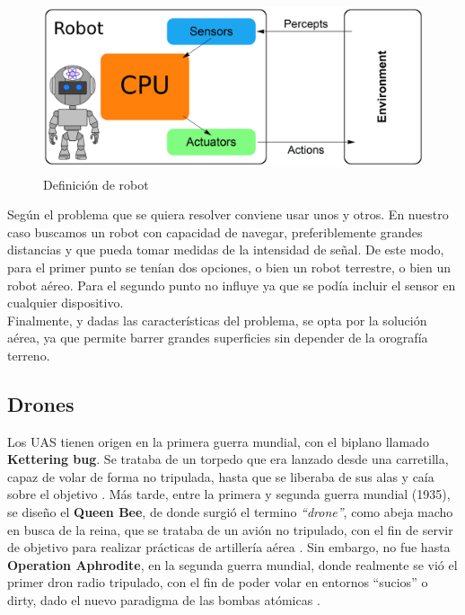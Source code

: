 \begin{figure} [H]
	\begin{center}
	\includegraphics[height=5cm]{imagenes/cap1/3_robot.png}
	\end{center}
	\caption[Definición de robot]{Definición de robot}
	\label{fig:robot_def}
\end{figure}

Según el problema que se quiera resolver conviene usar unos y otros. En nuestro caso buscamos un robot con capacidad de navegar, preferiblemente grandes distancias y que pueda tomar medidas de la intensidad de señal. De este modo, para el primer punto se tenían dos opciones, o bien un robot terrestre, o bien un robot aéreo. Para el segundo punto no influye ya que se podía incluir el sensor en cualquier dispositivo.\\

Finalmente, y dadas las características del problema, se opta por la solución aérea, ya que permite barrer grandes superficies sin depender de la orografía terreno.

\subsection{Drones}
\label{subsec:drones}

Los \ac{UAS} tienen origen en la primera guerra mundial, con el biplano llamado \textbf{Kettering bug}. Se trataba de un torpedo que era lanzado desde una carretilla, capaz de volar de forma no tripulada, hasta que se liberaba de sus alas y caía sobre el objetivo \cite{kettering-bug}. Más tarde, entre la primera y segunda guerra mundial (1935), se diseño el \textbf{Queen Bee}, de donde surgió el termino \emph{``drone''}, como abeja macho en busca de la reina, que se trataba de un avión no tripulado, con el fin de servir de objetivo para realizar prácticas de artillería aérea \cite{queen-bee}. Sin embargo, no fue hasta \textbf{Operation Aphrodite}, en la segunda guerra mundial, donde realmente se vió el primer dron radio tripulado, con el fin de poder volar en entornos ``sucios'' o dirty, dado el nuevo paradigma de las bombas atómicas \cite{operation-aphrodite}.\\

